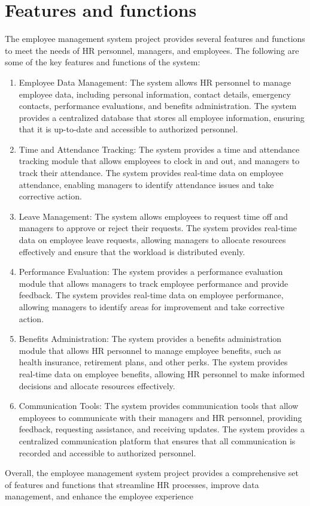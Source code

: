 \documentclass{article}
\begin{document}
\section{Features and functions}
The employee management system project provides several features
and functions to meet the needs of HR personnel, managers, and
employees. The following are some of the key features and functions of
the system: 
\begin{enumerate}
    \item Employee Data Management: The system allows HR personnel to
manage employee data, including personal information, contact
details, emergency contacts, performance evaluations, and
benefits administration. The system provides a centralized
database that stores all employee information, ensuring that it is
up-to-date and accessible to authorized personnel.
\item Time and Attendance Tracking: The system provides a time and
attendance tracking module that allows employees to clock in and
out, and managers to track their attendance. The system provides
real-time data on employee attendance, enabling managers to
identify attendance issues and take corrective action.
\item Leave Management: The system allows employees to request time
off and managers to approve or reject their requests. The system
provides real-time data on employee leave requests, allowing
managers to allocate resources effectively and ensure that the
workload is distributed evenly. 
\item Performance Evaluation: The system provides a performance
evaluation module that allows managers to track employee
performance and provide feedback. The system provides real-time
data on employee performance, allowing managers to identify
areas for improvement and take corrective action. 
\item Benefits Administration: The system provides a benefits
administration module that allows HR personnel to manage
employee benefits, such as health insurance, retirement plans, and
other perks. The system provides real-time data on employee
benefits, allowing HR personnel to make informed decisions and
allocate resources effectively.
\item Communication Tools: The system provides communication tools
that allow employees to communicate with their managers and HR
personnel, providing feedback, requesting assistance, and
receiving updates. The system provides a centralized
communication platform that ensures that all communication is
recorded and accessible to authorized personnel.
\end{enumerate}
Overall, the employee management system project provides a
comprehensive set of features and functions that streamline HR
processes, improve data management, and enhance the employee
experience
\end{document}
